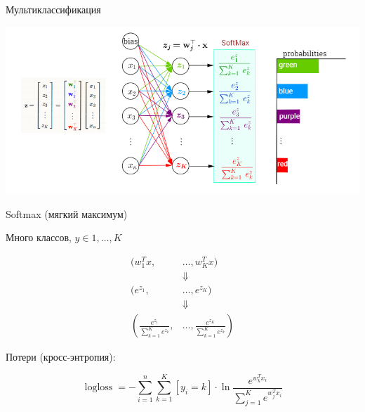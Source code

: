\documentclass[notes,12pt, aspectratio=169]{beamer}
\DeclareMathOperator{\logloss}{logloss}
\begin{document}
\begin{frame}{Мультиклассификация}
\begin{center}
\includegraphics[width=0.9\paperwidth]{softmax.png}
\end{center}
\end{frame}


\begin{frame}{Softmax (мягкий максимум)}

Много классов, $y \in {1, \ldots, K}$

\begin{equation*}
\begin{aligned}
(w_1^T x, &\ldots, w_K^Tx) \\
&\Downarrow \\
(e^{z_1}, &\ldots, e^{z_K}) \\
&\Downarrow \\
\left(\frac{e^{z_1}}{\sum_{k=1}^K e^{z_k}}\right., &\ldots,\left. \frac{e^{z_K}}{\sum_{k=1}^K e^{z_k}}  \right)
\end{aligned}
\end{equation*}

Потери (кросс-энтропия):

\[
\logloss =  - \sum_{i=1}^n \sum_{k=1}^K [y_i = k] \cdot \ln \frac{e^{w_k^Tx_i}}{\sum_{j=1}^{K} e^{w_j^Tx_i}}
\]
\end{frame}
\end{document}
